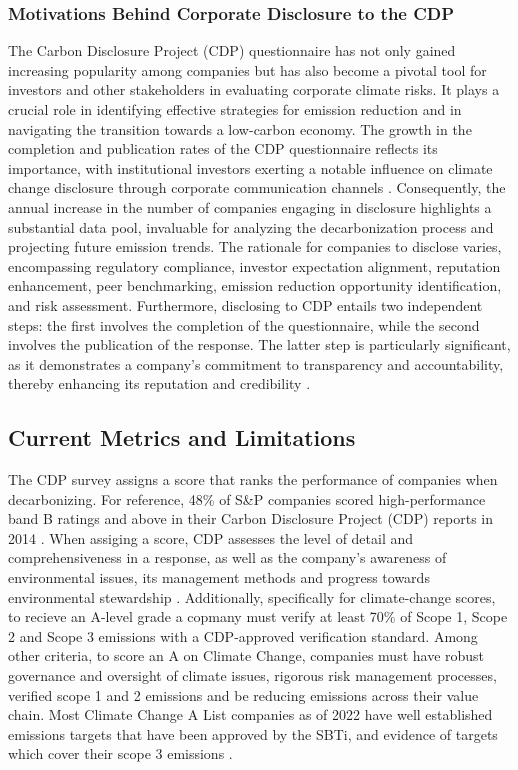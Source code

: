 \subsubsection{Motivations Behind Corporate Disclosure to the CDP}
The Carbon Disclosure Project (CDP) questionnaire has not only gained increasing popularity among companies but has also become a pivotal tool for investors and other stakeholders in evaluating corporate climate risks. It plays a crucial role in identifying effective strategies for emission reduction and in navigating the transition towards a low-carbon economy. The growth in the completion and publication rates of the CDP questionnaire reflects its importance, with institutional investors exerting a notable influence on climate change disclosure through corporate communication channels \cite{Cotter2012Institutional}. Consequently, the annual increase in the number of companies engaging in disclosure highlights a substantial data pool, invaluable for analyzing the decarbonization process and projecting future emission trends. The rationale for companies to disclose varies, encompassing regulatory compliance, investor expectation alignment, reputation enhancement, peer benchmarking, emission reduction opportunity identification, and risk assessment. Furthermore, disclosing to CDP entails two independent steps: the first involves the completion of the questionnaire, while the second involves the publication of the response. The latter step is particularly significant, as it demonstrates a company’s commitment to transparency and accountability, thereby enhancing its reputation and credibility \cite{Cotter2012Institutional}.

\subsection{Current Metrics and Limitations}
The CDP survey assigns a score that ranks the performance of companies when decarbonizing. For reference, 48\% of S\&P companies scored high-performance band B ratings and above in their Carbon Disclosure Project (CDP) reports in 2014 \cite{Upadhyay2022Improving}. When assiging a score, CDP assesses the level of detail and comprehensiveness in a response, as well as the company’s awareness of environmental issues, its management methods and progress towards environmental stewardship \cite{CDP2022ScoringPDF}. Additionally, specifically for climate-change scores, to recieve an A-level grade a copmany must verify at least 70\% of Scope 1, Scope 2 and Scope 3 emissions with a CDP-approved verification standard. Among other criteria, to score an A on Climate Change, companies must have robust governance and oversight of climate issues, rigorous risk management processes, verified scope 1 and 2 emissions and be reducing emissions across their value chain. Most Climate Change A List companies as of 2022 have well established emissions targets that have been approved by the SBTi, and evidence of targets which cover their scope 3 emissions \cite{CDP2022ScoringPDF}. 


